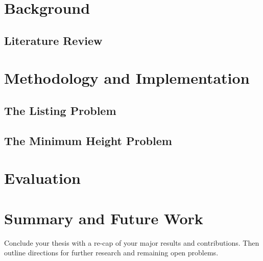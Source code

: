 \chapter{Background}
\label{chapter:background}
 


\section{Literature Review}


\chapter{Methodology and Implementation}  
\label{chapter:methodology}
\section{The Listing Problem}





\section{The Minimum Height Problem}



\chapter{Evaluation}  
\label{chapter:evaluation}



\chapter{Summary and Future Work}
\label{chapter:summary}

Conclude your thesis with a re-cap of your major results and contributions.  Then outline directions for further research and remaining open problems.